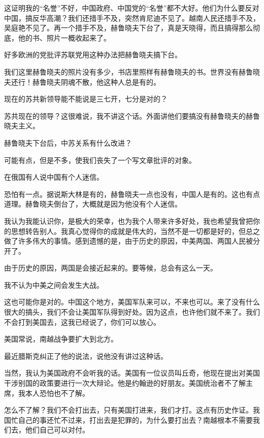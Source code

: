 这证明我的“名誉”不好，中国政府、中国党的“名誉”都不大好。他们为什么要反对中国，搞反华高潮？我们还措手不及，突然肯尼迪不见了。越南人民还措手不及，吴庭艳不见了。再一个措手不及，赫鲁晓夫下台了，真是天晓得，而且搞得那么彻底，他的书、照片一概收起来了。

好多欧洲的党批评苏联党用这种办法把赫鲁晓夫搞下台。

我们这里赫鲁晓夫的照片没有多少，书店里照样有赫鲁晓夫的书。世界没有赫鲁晓夫还行！赫鲁晓夫阴魂不散，他这种人总是有的。

现在的苏共新领导能不能说是三七开，七分是对的？

苏共现在的领导？这很难说，我不讲这个话。外面讲他们要搞没有赫鲁晓夫的赫鲁晓夫主义。

赫鲁晓夫下台后，中苏关系有什么改进？

可能有点，但是不多，使我们丧失了一个写文章批评的对象。

在俄国有人说中国有个人迷信。

恐怕有一点。据说斯大林是有的，赫鲁晓夫一点也没有，中国人是有的。这也有点道理。赫鲁晓夫倒台了，大概就是因为他没有个人迷信。

我认为我能认识你，是极大的荣幸，也为我个人带来许多好处，我也希望我曾把你的思想转告别人。我真心觉得你的成就是伟大的，当然不是一切都是好的，但总之做了许多伟大的事情。感到遗憾的是，由于历史的原因，中美两国、两国人民被分开了。

由于历史的原因，两国是会接近起来的。要等候，总会有这么一天。

我不认为中美之间会发生大战。

这也可能你是对的。中国这个地方，美国军队来可以，不来也可以。来了没有什么很大的搞头，我们不会让美国军队得到好处。因为这点，也许他们就不来了。我们不会打到美国去，这我已经说了，你们可以放心。

美国常说，南越战争要扩大到北方。

最近腊斯克纠正了他的说法，说他没有讲过这种话。

当然，我认为美国政府不会听我的话。美国有一位议员叫丘奇，他现在提出对美国干涉别国的政策要进行一次大辩论。他是约翰逊的好朋友。美国统治者不了解主席，我本人恐怕也不了解。

怎么不了解？我们不会打出去，只有美国打进来，我们才打。这点有历史作证。我国忙自己的事还忙不过来，打出去是犯罪的，为什么要打出去？南越根本不需要我们去，他们自己可以对付。


